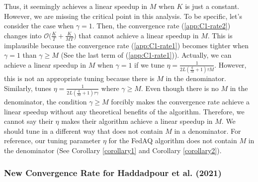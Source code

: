 Thus, it seemingly achieves a linear speedup in $M$ when $K$ is just a constant. However, we are missing the critical point in this analysis. To be specific, let's consider the case when $\gamma = 1$. Then, the convergence rate (\ref{app:C1-rate2}) changes into $\mathcal{O}\Big( \frac{K}{T} + \frac{K}{MT}\Big)$ that cannot achieve a linear speedup in $M$. This is implausible because the convergence rate (\ref{app:C1-rate1}) becomes tighter when $\gamma = 1$ than $\gamma \geq M$ (See the last term of (\ref{app:C1-rate1})). Actually, we can achieve a linear speedup in $M$ when $\gamma = 1$ if we tune $\eta = \frac{1}{2L(\frac{q}{M}+1)\tau M}$. However, this is not an appropriate tuning because there is $M$ in the denominator. Similarly, \citet{haddadpour2021federated} tunes $\eta = \frac{1}{2L(\frac{q}{M}+1)\tau\gamma}$ where $\gamma \geq M$. Even though there is no $M$ in the denominator, the condition $\gamma \geq M$ forcibly makes the convergence rate achieve a linear speedup without any theoretical benefits of the algorithm. Therefore, we cannot say their $\eta$ makes their algorithm achieve a linear speedup in $M$. We should tune in a different way that does not contain $M$ in a denominator. For reference, our tuning parameter $\eta$ for the FedAQ algorithm does not contain $M$ in the denominator (See Corollary \ref{corollary1} and Corollary \ref{corollary2}). 

\subsubsection{New Convergence Rate for Haddadpour et al. (2021)}

